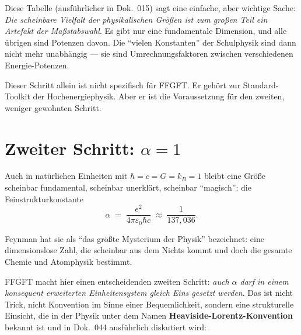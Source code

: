 \begin{center}
\end{center}

Diese Tabelle (ausführlicher in Dok.~015) sagt eine einfache, aber wichtige
Sache: \emph{Die scheinbare Vielfalt der physikalischen Größen ist zum
großen Teil ein Artefakt der Maßstabswahl}. Es gibt nur eine fundamentale
Dimension, und alle übrigen sind Potenzen davon. Die ``vielen Konstanten''
der Schulphysik sind dann nicht mehr unabhängig --- sie sind
Umrechnungsfaktoren zwischen verschiedenen Energie-Potenzen.

Dieser Schritt allein ist nicht spezifisch für FFGFT. Er gehört zur
Standard-Toolkit der Hochenergiephysik. Aber er ist die Voraussetzung
für den zweiten, weniger gewohnten Schritt.

\section{Zweiter Schritt: $\alpha = 1$}

Auch in natürlichen Einheiten mit $\hbar = c = G = k_B = 1$ bleibt eine
Größe scheinbar fundamental, scheinbar unerklärt, scheinbar
``magisch'': die Feinstrukturkonstante
\[
  \alpha \;=\; \frac{e^{2}}{4\pi\varepsilon_{0}\hbar c} \;\approx\; \frac{1}{137{,}036}.
\]

Feynman hat sie als ``das größte Mysterium der Physik'' bezeichnet: eine
dimensionslose Zahl, die scheinbar aus dem Nichts kommt und doch die gesamte
Chemie und Atomphysik bestimmt.

FFGFT macht hier einen entscheidenden zweiten Schritt: \emph{auch $\alpha$
darf in einem konsequent erweiterten Einheitensystem gleich Eins gesetzt
werden}. Das ist nicht Trick, nicht Konvention im Sinne einer
Bequemlichkeit, sondern eine strukturelle Einsicht, die in der Physik unter
dem Namen \textbf{Heaviside-Lorentz-Konvention} bekannt ist und in Dok.~044
ausführlich diskutiert wird:

